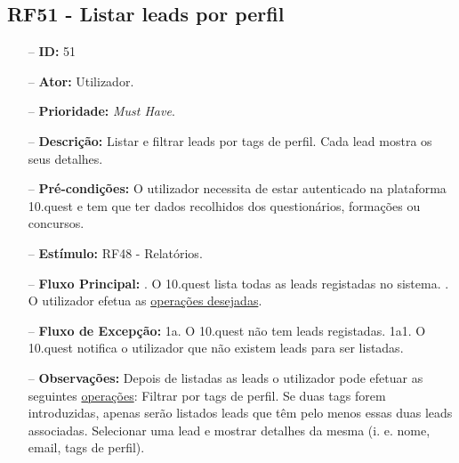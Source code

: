 \subsection{RF51 - Listar leads por perfil}
\begin{itemize}
	\item[--] \textbf{ID:} 51
	\item[--]  \textbf{Ator:} Utilizador.
	\item[--]  \textbf{Prioridade:} \textit{Must Have}.
	\item[--]  \textbf{Descrição:} Listar e filtrar leads por tags de perfil. Cada lead mostra os seus detalhes.
	\item[--]  \textbf{Pré-condições:} O utilizador necessita de estar autenticado na plataforma 10.quest e tem que ter dados recolhidos dos questionários, formações ou concursos.
	\item[--]  \textbf{Estímulo:} RF48 - Relatórios.
	\item[--]  \textbf{Fluxo Principal:} 
	. O 10.quest lista todas as leads registadas no sistema.
	. O utilizador efetua as \underline{operações desejadas}.
	\item[--]  \textbf{Fluxo de Excepção:} 
	\subitem 1a. O 10.quest não tem leads registadas.
	\subitem 1a1. O 10.quest notifica o utilizador que não existem leads para ser listadas.
	\item[--]  \textbf{Observações:} Depois de listadas as leads o utilizador pode efetuar as seguintes \underline{operações}:
		\subitem Filtrar por tags de perfil. Se duas tags forem introduzidas, apenas serão listados leads que têm pelo menos essas duas leads associadas.
		\subitem Selecionar uma lead e mostrar detalhes da mesma (i. e. nome, email, tags de perfil).
\end{itemize}
\newpage

